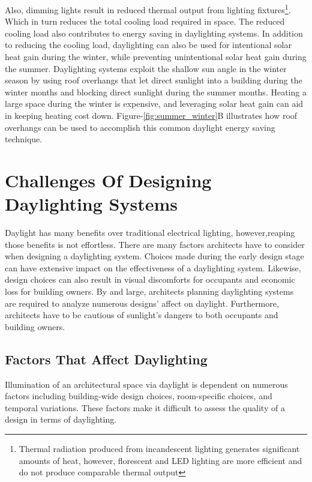     Also, dimming lights result in reduced thermal output from lighting fixtures\footnote{Thermal radiation produced from incandescent lighting generates significant amounts of heat, however, florescent and LED lighting are more efficient and do not produce comparable thermal output}. 
    Which in turn reduces the total cooling load required in space. The reduced cooling load also contributes to energy saving in daylighting systems\cite{Leslie}. 
    In addition to reducing the cooling load, daylighting can also be used for intentional solar heat gain during the winter, while preventing unintentional solar heat gain during the summer.
    Daylighting systems exploit the shallow sun angle in the winter season by using roof overhangs that let direct sunlight into a building during the winter months and blocking direct sunlight during the summer months. Heating a large space during the winter is expensive, and leveraging solar heat gain can aid in keeping heating cost down\cite{Bodart}. 
    Figure-\ref{fig:summer_winter}B illustrates how roof overhangs can be used to accomplish this common daylight energy saving technique.
    \\

\section{Challenges Of Designing Daylighting Systems}
  
  Daylight has many benefits over traditional electrical lighting, however,reaping those benefits is not effortless. There are many factors architects have to consider when designing a daylighting system. Choices made during the early design stage can have extensive impact on the effectiveness of a daylighting system. Likewise, design choices can also result in visual discomforts for occupants and economic loss for building owners. By and large, architects planning daylighting systems are required to analyze numerous designs' affect on daylight. Furthermore, architects have to be cautious of sunlight's dangers to both occupants and building owners.

  \subsection{Factors That Affect Daylighting}

    Illumination of an architectural space via daylight is dependent on numerous factors including building-wide design choices, room-specific choices, and temporal variations.
    These factors make it difficult to assess the quality of a design in terms of daylighting.\\

